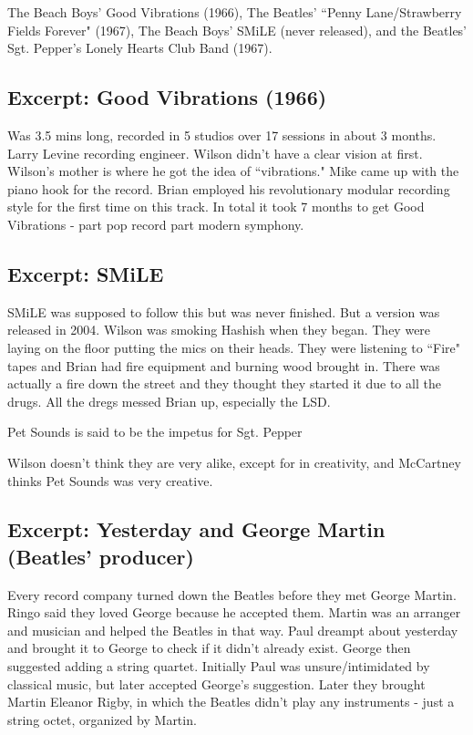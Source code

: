 \documentclass[12pt, a4paper, twoside, openright, titlepage]{book}
\begin{document}
The Beach Boys' Good Vibrations (1966), The Beatles' ``Penny Lane/Strawberry Fields Forever" (1967), The Beach Boys' SMiLE (never released), and the Beatles' Sgt. Pepper's Lonely Hearts Club Band (1967).

\subsection{Excerpt: Good Vibrations (1966)}

Was 3.5 mins long, recorded in 5 studios over 17 sessions in about 3 months. Larry Levine recording engineer. Wilson didn't have a clear vision at first. Wilson's mother is where he got the idea of ``vibrations." Mike came up with the piano hook for the record. Brian employed his revolutionary modular recording style for the first time on this track. In total it took 7 months to get Good Vibrations - part pop record part modern symphony.

\subsection{Excerpt: SMiLE}

SMiLE was supposed to follow this but was never finished. But a version was released in 2004. Wilson was smoking Hashish when they began. They were laying on the floor putting the mics on their heads. They were listening to ``Fire" tapes and Brian had fire equipment and burning wood brought in. There was actually a fire down the street and they thought they started it due to all the drugs. All the dregs messed Brian up, especially the LSD.

\begin{rec}{}{}
    Pet Sounds is said to be the impetus for Sgt. Pepper
\end{rec}

Wilson doesn't think they are very alike, except for in creativity, and McCartney thinks Pet Sounds was very creative.


\subsection{Excerpt: Yesterday and George Martin (Beatles' producer)}

Every record company turned down the Beatles before they met George Martin. Ringo said they loved George because he accepted them. Martin was an arranger and musician and helped the Beatles in that way. Paul dreampt about yesterday and brought it to George to check if it didn't already exist. George then suggested adding a string quartet. Initially Paul was unsure/intimidated by classical music, but later accepted George's suggestion. Later they brought Martin Eleanor Rigby, in which the Beatles didn't play any instruments - just a string octet, organized by Martin.
\end{document}
